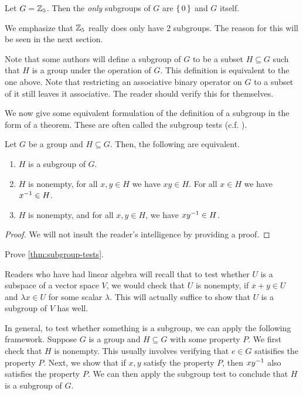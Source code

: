 \documentclass[./main.tex]{subfiles}
\begin{document}
\begin{example}
    Let $G = \mathbb{Z}_5$. Then the \emph{only} subgroups of $G$ are $\set{0}$ and $G$ itself.
\end{example}
We emphasize that $\mathbb{Z}_5$ really does only have 2 subgroups. The reason for this
will be seen in the next section.


Note that some authors will define a subgroup of $G$ to be a subset $H \subseteq
G$ such that $H$ is a group under the operation of $G$. This definition is
equivalent to the one above. Note that restricting an associative binary
operator on $G$ to a subset of it still leaves it associative. The reader should
verify this for themselves.

We now give some equivalent formulation of the definition of a subgroup in the
form of a theorem. These are often called the subgroup tests (c.f. \cite{Gallian_2020}).
\begin{theorem}
\label{thm:subgroup-tests}
    Let $G$ be a group and $H \subseteq G$. Then, the following are equivalent.
    \begin{enumerate}
        \item $H$ is a subgroup of $G$.
        \item $H$ is nonempty, for all $x ,y \in H$ we have $xy \in H$. For all
        $x \in H$ we have $x ^{-1} \in H$.
        \item $H$ is nonempty, and for all $x,y \in H$, we have $xy^{-1} \in H$.
    \end{enumerate}
\end{theorem}
\begin{proof}
    We will not insult the reader's intelligence by providing a proof.
\end{proof}
\begin{exercise}
    Prove \cref{thm:subgroup-tests}.
\end{exercise}

Readers who have had linear algebra will recall that to test whether $U$ is a
subspace of a vector space $V$, we would check that $U$ is nonempty, if $x + y
\in U$ and $\lambda x \in U$ for some scalar $\lambda$. This will actually
suffice to show that $U$ is a subgroup of $V$ has well. 

In general, to test whether something is a subgroup, we can apply the following
framework. Suppose $G$ is a group and $H \subseteq G$ with some property $P$. We
first check that $H$ is nonempty. This usually involves verifying that $e \in G$
satisifies the property $P$. Next, we show that if $x, y$ satisfy the property
$P$, then $xy^{-1}$ also satisfies the property $P$. We can then apply the
subgroup test to conclude that $H$ is a subgroup of $G$. 
\end{document}
